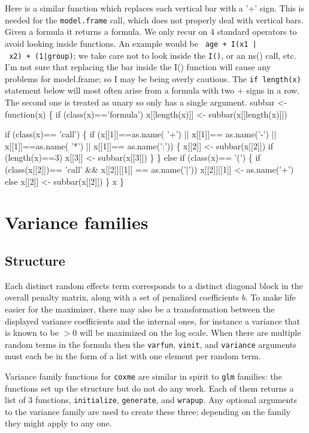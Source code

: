 \documentclass{article}
\begin{document}
Here is a similar function which replaces each vertical bar with a '+'
sign.  This is needed for the {\tt{}model.frame} call, which does not
properly deal with vertical bars. 
Given a formula it returns a formula.
We only recur on 4 standard operators to avoid looking inside functions. 
An example would be {\tt{}{}\ age\ +\ I(x1\ |\ x2)\ +\ (1|group)}; we take care not to
look inside the {\tt{}I()}, or an ns() call, etc.
I'm not sure that replacing the bar inside the I() function will            %
cause any problems for model.frame; so I may be being overly cautious.
The {\tt{}if\ length(x)} statement below will most often arise from a formula 
with two + signs in a row.  The second one is treated as unary so only has
a single argument.
\nwenddocs{}\plusendmoddef
subbar <- function(x) \{
    if (class(x)=='formula') x[[length(x)]] <- subbar(x[[length(x)]])

    if (class(x)== 'call') \{
        if (x[[1]]==as.name( '+') || x[[1]]== as.name('-') ||
            x[[1]]==as.name( '*') || x[[1]]== as.name(':')) \{
            x[[2]] <- subbar(x[[2]])
            if (length(x)==3) x[[3]] <- subbar(x[[3]])
            \}
        \}
    else if (class(x)== '(') \{
        if (class(x[[2]])== 'call' && x[[2]][[1]] == as.name('|')) 
            x[[2]][[1]] <- as.name('+')
        else x[[2]] <- subbar(x[[2]])
        \}
    x
    \}
   
\nwendcode{}\nwdocspar
    
    
\section{Variance families}
\subsection{Structure}
Each distinct random effects term corresponds to a distinct
diagonal block in the overall penalty matrix, along with a
set of penalized coefficients $b$.
To make life easier for the maximizer, there may also
be a transformation between the displayed variance 
coefficients and the internal ones, for instance a variance that is
known to be $>0$ will be maximized on the log scale.
When there are multiple random terms in the formula then the
{\tt{}varfun}, {\tt{}vinit}, and {\tt{}variance} arguments must each be in
the form of a list with one element per random term. 

Variance family functions for {\tt{}coxme} are similar in spirit to {\tt{}glm}
families: the functions set up the structure but do not do any
work.  
Each of them returns a list of 3 functions, {\tt{}initialize}, {\tt{}generate}, and
{\tt{}wrapup}.
Any optional arguments to the variance family are used to create these
three; depending on the family they might apply to any one.
\end{document}
